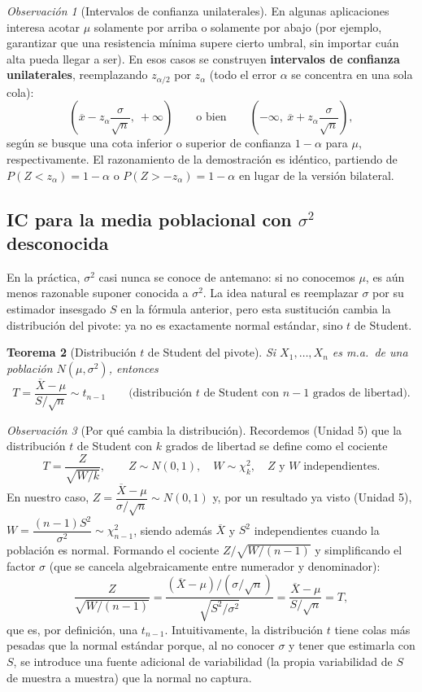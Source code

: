 \documentclass[11pt,a4paper]{article}
\theoremstyle{plain}
\newtheorem{teorema}{Teorema}[section]
\theoremstyle{definition}
\theoremstyle{remark}
\newtheorem{observacion}[teorema]{Observación}
\begin{document}
\begin{observacion}[Intervalos de confianza unilaterales]
En algunas aplicaciones interesa acotar $\mu$ solamente por arriba o solamente por abajo (por ejemplo, garantizar que una resistencia mínima supere cierto umbral, sin importar cuán alta pueda llegar a ser). En esos casos se construyen \textbf{intervalos de confianza unilaterales}, reemplazando $z_{\alpha/2}$ por $z_\alpha$ (todo el error $\alpha$ se concentra en una sola cola):
\[
\left(\overline x - z_\alpha\frac{\sigma}{\sqrt n},\ +\infty\right) \qquad\text{o bien}\qquad \left(-\infty,\ \overline x+z_\alpha\frac{\sigma}{\sqrt n}\right),
\]
según se busque una cota inferior o superior de confianza $1-\alpha$ para $\mu$, respectivamente. El razonamiento de la demostración es idéntico, partiendo de $P(Z<z_\alpha)=1-\alpha$ o $P(Z>-z_\alpha)=1-\alpha$ en lugar de la versión bilateral.
\end{observacion}

\subsection{IC para la media poblacional con \texorpdfstring{$\sigma^2$}{sigma\texttwosuperior} desconocida}

En la práctica, $\sigma^2$ casi nunca se conoce de antemano: si no conocemos $\mu$, es aún menos razonable suponer conocida a $\sigma^2$. La idea natural es reemplazar $\sigma$ por su estimador insesgado $S$ en la fórmula anterior, pero esta sustitución cambia la distribución del pivote: ya no es exactamente normal estándar, sino $t$ de Student.

\begin{teorema}[Distribución $t$ de Student del pivote]
Si $X_1,\dots,X_n$ es m.a.\ de una población $N(\mu,\sigma^2)$, entonces
\[
T = \frac{\overline X-\mu}{S/\sqrt n} \sim t_{n-1} \qquad \text{(distribución $t$ de Student con $n-1$ grados de libertad).}
\]
\end{teorema}

\begin{observacion}[Por qué cambia la distribución]
Recordemos (Unidad 5) que la distribución $t$ de Student con $k$ grados de libertad se define como el cociente
\[
T = \frac{Z}{\sqrt{W/k}}, \qquad Z\sim N(0,1),\quad W\sim \chi^2_k, \quad Z \text{ y } W \text{ independientes.}
\]
En nuestro caso, $Z=\dfrac{\overline X-\mu}{\sigma/\sqrt n}\sim N(0,1)$ y, por un resultado ya visto (Unidad 5), $W=\dfrac{(n-1)S^2}{\sigma^2}\sim \chi^2_{n-1}$, siendo además $\overline X$ y $S^2$ independientes cuando la población es normal. Formando el cociente $Z/\sqrt{W/(n-1)}$ y simplificando el factor $\sigma$ (que se cancela algebraicamente entre numerador y denominador):
\[
\frac{Z}{\sqrt{W/(n-1)}} = \frac{(\overline X-\mu)/(\sigma/\sqrt n)}{\sqrt{S^2/\sigma^2}} = \frac{\overline X-\mu}{S/\sqrt n} = T,
\]
que es, por definición, una $t_{n-1}$. Intuitivamente, la distribución $t$ tiene colas más pesadas que la normal estándar porque, al no conocer $\sigma$ y tener que estimarla con $S$, se introduce una fuente adicional de variabilidad (la propia variabilidad de $S$ de muestra a muestra) que la normal no captura.
\end{observacion}
\end{document}
